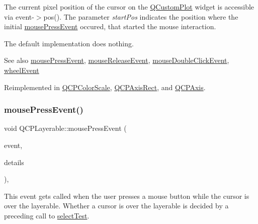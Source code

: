 The current pixel position of the cursor on the \mbox{\hyperlink{class_q_custom_plot}{Q\+Custom\+Plot}} widget is accessible via {\ttfamily event-\/$>$pos()}. The parameter {\itshape start\+Pos} indicates the position where the initial \mbox{\hyperlink{class_q_c_p_layerable_af6567604818db90f4fd52822f8bc8376}{mouse\+Press\+Event}} occured, that started the mouse interaction.

The default implementation does nothing.

\begin{DoxySeeAlso}{See also}
\mbox{\hyperlink{class_q_c_p_layerable_af6567604818db90f4fd52822f8bc8376}{mouse\+Press\+Event}}, \mbox{\hyperlink{class_q_c_p_layerable_aa0d79b005686f668622bbe66ac03ba2c}{mouse\+Release\+Event}}, \mbox{\hyperlink{class_q_c_p_layerable_a4171e2e823aca242dd0279f00ed2de81}{mouse\+Double\+Click\+Event}}, \mbox{\hyperlink{class_q_c_p_layerable_a47dfd7b8fd99c08ca54e09c362b6f022}{wheel\+Event}} 
\end{DoxySeeAlso}


Reimplemented in \mbox{\hyperlink{class_q_c_p_color_scale_a3b2bd79725aefaf2630fc76e90939442}{Q\+C\+P\+Color\+Scale}}, \mbox{\hyperlink{class_q_c_p_axis_rect_a9cd27ad8c5cfb49aefd9dbb30def4beb}{Q\+C\+P\+Axis\+Rect}}, and \mbox{\hyperlink{class_q_c_p_axis_ac5a269609e6177737faabdc46434d8c7}{Q\+C\+P\+Axis}}.

\mbox{\label{class_q_c_p_layerable_af6567604818db90f4fd52822f8bc8376}} 
\subsubsection{\texorpdfstring{mousePressEvent()}{mousePressEvent()}}
{\footnotesize\ttfamily void Q\+C\+P\+Layerable\+::mouse\+Press\+Event (\begin{DoxyParamCaption}\item[{Q\+Mouse\+Event $\ast$}]{event,  }\item[{const Q\+Variant \&}]{details }\end{DoxyParamCaption})\hspace{0.3cm}{\ttfamily [protected]}, {\ttfamily [virtual]}}

This event gets called when the user presses a mouse button while the cursor is over the layerable. Whether a cursor is over the layerable is decided by a preceding call to \mbox{\hyperlink{class_q_c_p_layerable_a04db8351fefd44cfdb77958e75c6288e}{select\+Test}}.

